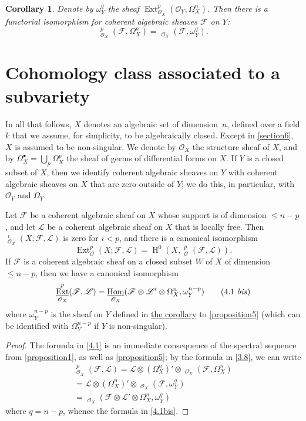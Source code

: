 \documentclass{article}
\theoremstyle{plain}
\newenvironment{lemma}[1]
  {\renewcommand\theinnercustomlemma{#1}\innercustomlemma}
  {\endinnercustomlemma}
\newtheorem*{corollary*}{Corollary}
\theoremstyle{definition}
\newcommand{\sh}{\mathscr}
\renewcommand{\leq}{\leqslant}
\DeclareMathOperator{\Ext}{Ext}
\DeclareMathOperator{\shExt}{\underline{Ext}}
\DeclareMathOperator{\shHom}{\underline{Hom}}
\DeclareMathOperator{\HH}{H}
\newcommand{\oldpage}[1]{\marginpar{\footnotesize$\Big\vert$ \textit{p.~#1}}}
\begin{document}
\begin{corollary*}
\label{proposition5corollary}
  Denote by $\omega_Y^q$ the sheaf $\Ext_{\sh{O}_X}^p(\sh{O}_Y,\Omega_X^n)$.
  Then there is a functorial isomorphism for coherent algebraic sheaves $\sh{F}$ on $Y$:
  \[
  \label{3.8}
    \shExt_{\sh{O}_X}^p(\sh{F},\Omega_X^n) = \shHom_{\sh{O}_X}(\sh{F},\omega_Y^q).
  \tag{3.8}
  \]
\end{corollary*}


\section{Cohomology class associated to a subvariety}
\label{section4}

In all that follows, $X$ denotes an algebraic set of dimension~$n$, defined over a field $k$ that we assume, for simplicity, to be algebraically closed.
Except in \cref{section6}, $X$ is assumed to be non-singular.
We denote by $\sh{O}_X$ the structure sheaf of $X$, and by $\Omega_X^\bullet=\bigcup_p\Omega_X^p$ the sheaf of germs of differential forms on $X$.
If $Y$ is a closed subset of $X$, then we identify coherent algebraic sheaves on $Y$ with coherent algebraic sheaves on $X$ that are zero outside of $Y$;
we do this, in particular, with $\sh{O}_Y$ and $\Omega_Y$.

\begin{lemma}{1}
\label{lemma1}
  Let $\sh{F}$ be a coherent algebraic sheaf on $X$ whose support is of dimension $\leq n-p$, and let $\sh{L}$ be a coherent algebraic sheaf on $X$ that is locally free.
  Then $\shExt_{\sh{O}_X}^i(X;\sh{F},\sh{L})$ is zero for $i<p$, and there is a canonical isomorphism
  \[
  \label{4.1}
    \Ext_\sh{O}^p(X;\sh{F},\sh{L}) = \HH^0(X,\shExt_\sh{O}^p(\sh{F},\sh{L})).
  \tag{4.1}
  \]
  If $\sh{F}$ is a coherent algebraic sheaf on a closed subset $W$ of $X$ of dimension $\leq n-p$, then we have a canonical isomorphism
  \[
  \label{4.1bis}
    \shExt_{\sh{O}_X}^p(\sh{F},\sh{L}) = \shHom_{\sh{O}_X}(\sh{F}\otimes\sh{L}'\otimes\Omega_X^n,\omega_Y^{n-p})
  \tag{4.1 \emph{bis}}
  \]
  where $\omega_Y^{n-p}$ is the sheaf on $Y$ defined in \hyperref[proposition5corollary]{the corollary} to \cref{proposition5} (which can be identified with $\Omega_Y^{n-p}$ if $Y$ is non-singular).
\end{lemma}

\begin{proof}
  The formula in \cref{4.1} is an immediate consequence of the spectral sequence from \cref{proposition1}, as well as \cref{proposition5};
  by the formula in \cref{3.8}, we can write
\oldpage{149-10}
  \[
    \begin{gathered}
      \shExt_{\sh{O}_X}^p(\sh{F},\sh{L})
      = \sh{L}\otimes(\Omega_X^n)'\otimes\shExt_{\sh{O}_X}(\sh{F},\Omega_X^n)
    \\= \sh{L}\otimes(\Omega_X^n)'\otimes\shHom_{\sh{O}_X}(\sh{F},\omega_Y^q)
    \\= \shHom_{\sh{O}_X}(\sh{F}\otimes\sh{L}'\otimes\Omega_X^n,\omega_Y^q)
    \end{gathered}
  \]
  where $q=n-p$, whence the formula in \cref{4.1bis}.
\end{proof}
\end{document}
